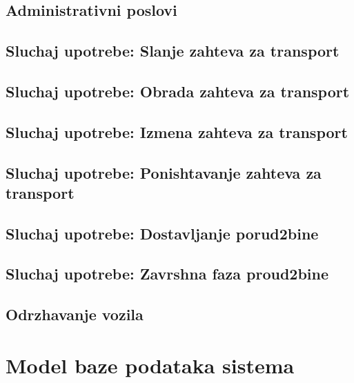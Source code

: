 \documentclass{article}
\begin{document}
\subsection{Administrativni poslovi}



\subsection{Sluchaj upotrebe: Slanje zahteva za transport}


\subsection{Sluchaj upotrebe: Obrada zahteva za transport}


\subsection{Sluchaj upotrebe: Izmena zahteva za transport}


\subsection{Sluchaj upotrebe: Ponishtavanje zahteva za transport}


\subsection{Sluchaj upotrebe: Dostavljanje porud2bine}

\subsection{Sluchaj upotrebe: Zavrshna faza proud2bine}


\subsection{Odrzhavanje vozila}



\section{Model baze podataka sistema}



\nocite{*}
\selectfont



\end{document}
